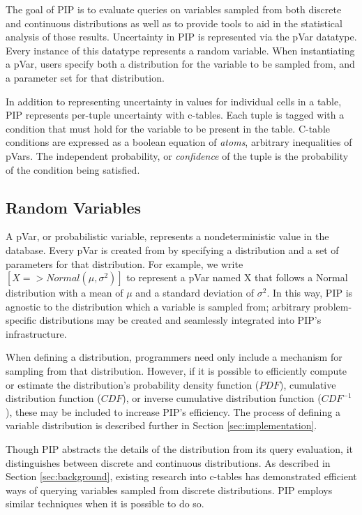 The goal of PIP is to evaluate queries on variables sampled from both discrete and continuous distributions as well as to provide tools to aid in the statistical analysis of those results.  Uncertainty in PIP is represented via the pVar datatype.  Every instance of this datatype represents a random variable.  When instantiating a pVar, users specify both a distribution for the variable to be sampled from, and a parameter set for that distribution.  

In addition to representing uncertainty in values for individual cells in a table, PIP represents per-tuple uncertainty with c-tables.  Each tuple is tagged with a condition that must hold for the variable to be present in the table.  C-table conditions are expressed as a boolean equation of \textit{atoms}, arbitrary inequalities of pVars.  The independent probability, or \textit{confidence} of the tuple is the probability of the condition being satisfied.  

\subsection{Random Variables}
  A pVar, or probabilistic variable, represents a nondeterministic value in the database.  Every pVar is created from by specifying a distribution and a set of parameters for that distribution.  For example, we write $[X=>Normal(\mu,\sigma^2)]$ to represent a pVar named X that follows a Normal distribution with a mean of $\mu$ and a standard deviation of $\sigma^2$.  In this way, PIP is agnostic to the distribution which a variable is sampled from; arbitrary problem-specific distributions may be created and seamlessly integrated into PIP's infrastructure.  

When defining a distribution, programmers need only include a mechanism for sampling from that distribution.  However, if it is possible to efficiently compute or estimate the distribution's probability density function ($PDF$), cumulative distribution function ($CDF$), or inverse cumulative distribution function ($CDF^{-1}$), these may be included to increase PIP's efficiency.  The process of defining a variable distribution is described further in Section \ref{sec:implementation}.  

Though PIP abstracts the details of the distribution from its query evaluation, it distinguishes between discrete and continuous distributions.  As described in Section \ref{sec:background}, existing research into c-tables has demonstrated efficient ways of querying variables sampled from discrete distributions.  PIP employs similar techniques when it is possible to do so.

